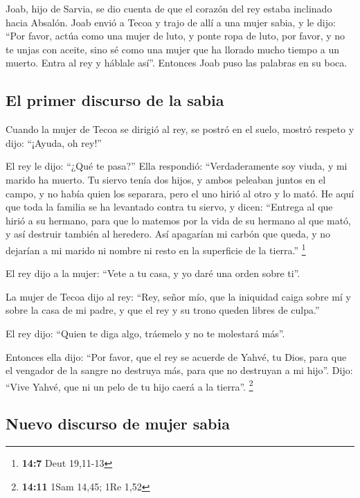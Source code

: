 \begin{paracol}{2}
 Joab, hijo de Sarvia, se dio cuenta de que el corazón del
rey estaba inclinado hacia Absalón.  Joab envió a Tecoa y
trajo de allí a una mujer sabia, y le dijo: ``Por favor, actúa como una
mujer de luto, y ponte ropa de luto, por favor, y no te unjas con
aceite, sino sé como una mujer que ha llorado mucho tiempo a un muerto.
 Entra al rey y háblale así''. Entonces Joab puso las
palabras en su boca.

\hypertarget{el-primer-discurso-de-la-sabia}{%
\subsection{El primer discurso de la
sabia}\label{el-primer-discurso-de-la-sabia}}

 Cuando la mujer de Tecoa se dirigió al rey, se postró en
el suelo, mostró respeto y dijo: ``¡Ayuda, oh rey!''

 El rey le dijo: ``¿Qué te pasa?'' Ella respondió:
``Verdaderamente soy viuda, y mi marido ha muerto.  Tu
siervo tenía dos hijos, y ambos peleaban juntos en el campo, y no había
quien los separara, pero el uno hirió al otro y lo mató. 
He aquí que toda la familia se ha levantado contra tu siervo, y dicen:
``Entrega al que hirió a su hermano, para que lo matemos por la vida de
su hermano al que mató, y así destruir también al heredero. Así
apagarían mi carbón que queda, y no dejarían a mi marido ni nombre ni
resto en la superficie de la tierra.'' \footnote{\textbf{14:7} Deut
  19,11-13}

 El rey dijo a la mujer: ``Vete a tu casa, y yo daré una
orden sobre ti''.

 La mujer de Tecoa dijo al rey: ``Rey, señor mío, que la
iniquidad caiga sobre mí y sobre la casa de mi padre, y que el rey y su
trono queden libres de culpa.''

 El rey dijo: ``Quien te diga algo, tráemelo y no te
molestará más''.

 Entonces ella dijo: ``Por favor, que el rey se acuerde
de Yahvé, tu Dios, para que el vengador de la sangre no destruya más,
para que no destruyan a mi hijo''. Dijo: ``Vive Yahvé, que ni un pelo de
tu hijo caerá a la tierra''. \footnote{\textbf{14:11} 1Sam 14,45; 1Re
  1,52}

\hypertarget{nuevo-discurso-de-mujer-sabia}{%
\subsection{Nuevo discurso de mujer
sabia}\label{nuevo-discurso-de-mujer-sabia}}


\end{paracol}
